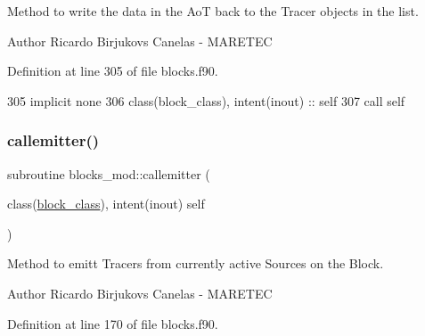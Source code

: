 Method to write the data in the AoT back to the Tracer objects in the list. 

\begin{DoxyAuthor}{Author}
Ricardo Birjukovs Canelas -\/ M\+A\+R\+E\+T\+EC 
\end{DoxyAuthor}


Definition at line 305 of file blocks.\+f90.


\begin{DoxyCode}
305     \textcolor{keywordtype}{implicit none}
306     \textcolor{keywordtype}{class}(block\_class), \textcolor{keywordtype}{intent(inout)} :: self
307     \textcolor{keyword}{call }self%
\end{DoxyCode}
\mbox{\label{namespaceblocks__mod_a2c3cf5113e1422d812c2c869afde2729}} 
\subsubsection{\texorpdfstring{callemitter()}{callemitter()}}
{\footnotesize\ttfamily subroutine blocks\+\_\+mod\+::callemitter (\begin{DoxyParamCaption}\item[{class(\mbox{\hyperlink{structblocks__mod_1_1block__class}{block\+\_\+class}}), intent(inout)}]{self }\end{DoxyParamCaption})\hspace{0.3cm}{\ttfamily [private]}}



Method to emitt Tracers from currently active Sources on the Block. 

\begin{DoxyAuthor}{Author}
Ricardo Birjukovs Canelas -\/ M\+A\+R\+E\+T\+EC 
\end{DoxyAuthor}


Definition at line 170 of file blocks.\+f90.



